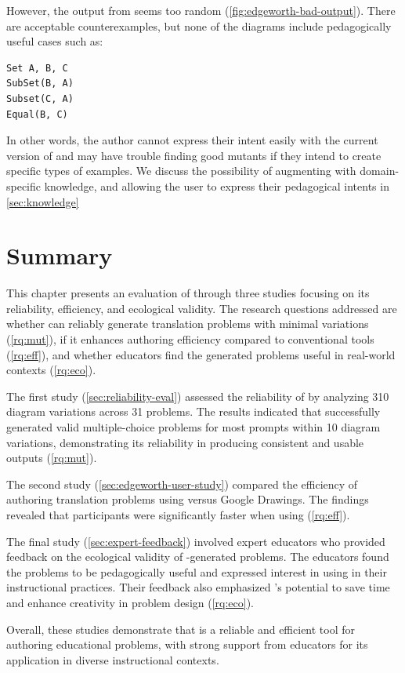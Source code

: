 However, the output from \Edgeworth seems too random (\cref{fig:edgeworth-bad-output}). There are acceptable counterexamples, but none of the diagrams include pedagogically useful cases such as:

\begin{center}
\begin{verbatim}
Set A, B, C
SubSet(B, A)
Subset(C, A)
Equal(B, C)
\end{verbatim}
\end{center}

In other words, the author cannot express their intent easily with the current version of \Edgeworth and may have trouble finding good mutants if they intend to create specific types of examples. We discuss the possibility of augmenting \Edgeworth with domain-specific knowledge, and allowing the user to express their pedagogical intents in \cref{sec:knowledge}


\section{Summary}

This chapter presents an evaluation of \Edgeworth through three studies focusing on its reliability, efficiency, and ecological validity. The research questions addressed are whether \Edgeworth can reliably generate translation problems with minimal variations (\ref{rq:mut}), if it enhances authoring efficiency compared to conventional tools (\ref{rq:eff}), and whether educators find the generated problems useful in real-world contexts (\ref{rq:eco}).

The first study (\cref{sec:reliability-eval}) assessed the reliability of \Edgeworth by analyzing 310 diagram variations across 31 problems. The results indicated that \Edgeworth successfully generated valid multiple-choice problems for most prompts within 10 diagram variations, demonstrating its reliability in producing consistent and usable outputs (\ref{rq:mut}).

The second study (\cref{sec:edgeworth-user-study}) compared the efficiency of authoring translation problems using \Edgeworth versus Google Drawings. The findings revealed that participants were significantly faster when using \Edgeworth (\ref{rq:eff}).

The final study (\cref{sec:expert-feedback}) involved expert educators who provided feedback on the ecological validity of \Edgeworth-generated problems. The educators found the problems to be pedagogically useful and expressed interest in using \Edgeworth in their instructional practices. Their feedback also emphasized \Edgeworth's potential to save time and enhance creativity in problem design (\ref{rq:eco}).

Overall, these studies demonstrate that \Edgeworth is a reliable and efficient tool for authoring educational problems, with strong support from educators for its application in diverse instructional contexts.





